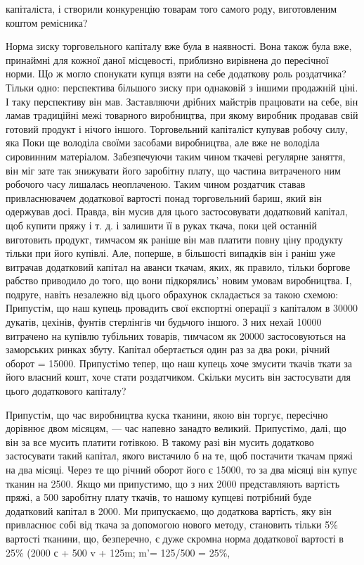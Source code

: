 \parcont{}  %
капіталіста, і створили конкуренцію товарам того самого роду, виготовленим коштом ремісника?

Норма зиску торговельного
капіталу вже була в наявності. Вона також була вже, принаймні для кожної даної місцевості, приблизно вирівнена до пересічної
норми. Що ж могло спонукати купця взяти на себе додаткову роль роздатчика? Тільки одно:  перспектива більшого зиску при
однаковій з іншими продажній ціні. І таку перспективу він мав. Заставляючи дрібних майстрів працювати на себе, він ламав
традиційні межі товарного виробництва, при якому виробник продавав свій готовий продукт і нічого іншого. Торговельний
капіталіст купував робочу силу, яка Поки ще володіла своїми засобами виробництва, але вже не володіла сировинним матеріалом.
Забезпечуючи таким чином ткачеві регулярне заняття, він міг зате так знижувати його заробітну плату, що частина витраченого
ним робочого часу лишалась неоплаченою. Таким чином роздатчик ставав привласнювачем додаткової вартості понад торговельний
бариш, який він одержував досі. Правда, він мусив для цього застосовувати додатковий капітал, щоб купити пряжу і т. д. і
залишити її в руках ткача, поки цей останній виготовить продукт, тимчасом як раніше він мав платити повну ціну продукту
тільки при його купівлі. Але, поперше, в більшості випадків він і раніш уже витрачав додатковий капітал на аванси ткачам,
яких, як правило, тільки боргове рабство приводило до того, що вони підкорялись’
новим умовам виробництва. І, подруге, навіть незалежно від цього обрахунок складається за такою схемою:
Припустім, що наш купець провадить свої експортні операції з капіталом в 30000 дукатів, цехінів, фунтів стерлінгів чи
будьчого іншого. З них нехай 10000 витрачено на купівлю тубільних товарів, тимчасом як 20000 застосовуються на заморських
ринках збуту. Капітал обертається один раз за два роки, річний оборот = 15000. Припустімо тепер, що наш купець хоче змусити
ткачів ткати за його власний кошт, хоче стати роздатчиком. Скільки мусить він застосувати для цього додаткового капіталу?

Припустім, що час виробництва куска тканини, якою він торгує, пересічно дорівнює двом місяцям, — час напевно занадто
великий. Припустімо, далі, що він за все мусить платити готівкою. В такому разі він мусить додатково застосувати такий
капітал, якого вистачило б на те, щоб постачити ткачам пряжі на два місяці. Через те що річний оборот його є 15000, то за
два місяці він купує тканин на 2500. Якщо ми припустимо, що з них 2000 представляють вартість пряжі, а 500 заробітну плату
ткачів, то нашому купцеві потрібний буде додатковий капітал в 2000. Ми припускаємо, що додаткова вартість, яку він
привласнює собі від ткача за допомогою нового методу, становить тільки 5\% вартості тканини, що, безперечно, є дуже скромна
норма додаткової вартості в 25\% (2000 с + 500 v + 125m; m'= 125/500 = 25\%,
\parbreak{}  %
